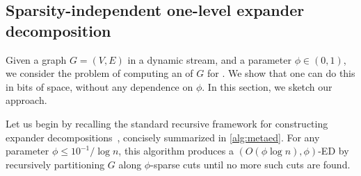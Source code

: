 \subsection{Sparsity-independent one-level expander decomposition}
\label{sec:techoverviewub}
Given a graph $G=(V,E)$ in a  dynamic stream, and a parameter $\phi \in (0,1)$, we consider the problem of computing an  of $G$ for . We show that one can do this in  bits of space, without any dependence on $\phi$.
In this section, we sketch our approach.

Let us begin by recalling the standard recursive framework for constructing expander decompositions~\cite{kvv,Trevisan08,stspectral}, concisely summarized in \cref{alg:metaed}. For any parameter $\phi \le 10^{-1}/\log n$, this algorithm produces a $(O(\phi \log n), \phi)$-ED by recursively partitioning $G$ along $\phi$-sparse cuts until no more such cuts are found.



